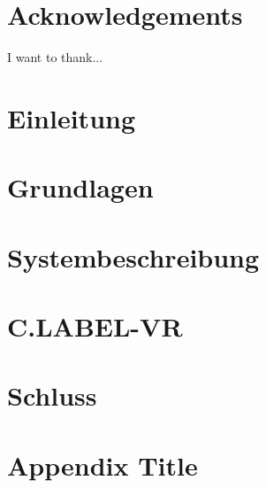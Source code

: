 \documentclass[12pt]{scrreprt}
\begin{document}
\chapter*{Acknowledgements}
I want to thank...
\newpage

\listoffigures





\chapter{Einleitung}


\chapter{Grundlagen}


\chapter{Systembeschreibung}


\chapter{C.LABEL-VR}
\label{sec:C.LABEL-VR}


\chapter{Schluss}




%


\appendix
\chapter{Appendix Title}
%





\end{document}
